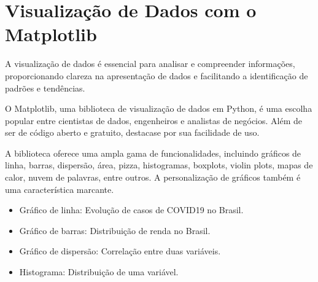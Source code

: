 \documentclass[letterpaper,10pt,english]{jupyterBook}
\begin{document}
\begin{sphinxVerbatim}[commandchars=\\\{\}]
  \PYG{p}{[} \PYG{p}{]}
  \PYG{p}{[}    \PYG{p}{]}
\end{sphinxVerbatim}


\section{Visualização de Dados com o Matplotlib}
\label{\detokenize{chapters/ch7/ch7:visualizacao-de-dados-com-o-matplotlib}}
\sphinxAtStartPar
{}

\sphinxAtStartPar
A visualização de dados é essencial para analisar e compreender informações, proporcionando clareza na apresentação de dados e facilitando a identificação de padrões e tendências.

\sphinxAtStartPar
O Matplotlib, uma biblioteca de visualização de dados em Python, é uma escolha popular entre cientistas de dados, engenheiros e analistas de negócios. Além de ser de código aberto e gratuito, destaca\sphinxhyphen{}se por sua facilidade de uso.

\sphinxAtStartPar
{}

\sphinxAtStartPar
A biblioteca oferece uma ampla gama de funcionalidades, incluindo gráficos de linha, barras, dispersão, área, pizza, histogramas, boxplots, violin plots, mapas de calor, nuvem de palavras, entre outros. A personalização de gráficos também é uma característica marcante.

\sphinxAtStartPar
{}
\begin{itemize}
\item {} 
\sphinxAtStartPar
Gráfico de linha: Evolução de casos de COVID\sphinxhyphen{}19 no Brasil.

\item {} 
\sphinxAtStartPar
Gráfico de barras: Distribuição de renda no Brasil.

\item {} 
\sphinxAtStartPar
Gráfico de dispersão: Correlação entre duas variáveis.

\item {} 
\sphinxAtStartPar
Histograma: Distribuição de uma variável.

\end{itemize}
\end{document}
